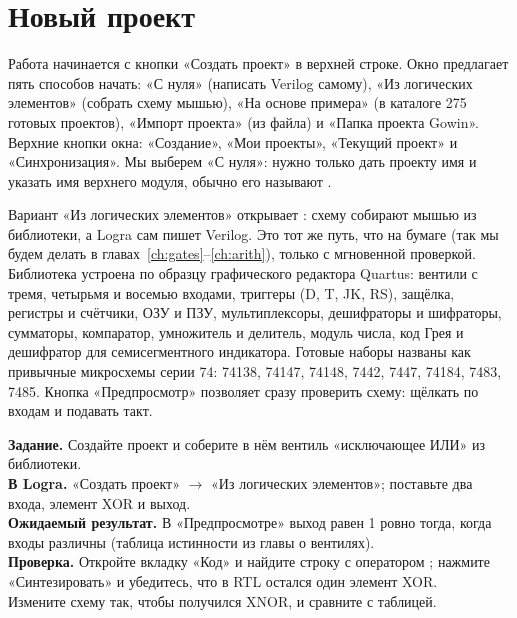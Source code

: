 \section{Новый проект}

Работа начинается с кнопки «Создать проект» в верхней строке. Окно
предлагает пять способов начать: «С нуля» (написать Verilog самому),
«Из логических элементов» (собрать схему мышью), «На основе примера» (в
каталоге 275 готовых проектов), «Импорт проекта» (из файла) и «Папка проекта
Gowin». Верхние кнопки окна: «Создание», «Мои проекты», «Текущий проект»
и «Синхронизация». Мы выберем «С нуля»: нужно только дать проекту имя и
указать имя верхнего модуля, обычно его называют .


Вариант «Из логических элементов» открывает : схему собирают
мышью из библиотеки, а Logra сам пишет Verilog. Это тот же путь, что на
бумаге (так мы будем делать в главах~\ref{ch:gates}--\ref{ch:arith}), только с
мгновенной проверкой. Библиотека устроена по
образцу графического редактора Quartus: вентили с тремя, четырьмя и восемью
входами, триггеры (D, T, JK, RS), защёлка, регистры и счётчики, ОЗУ и ПЗУ,
мультиплексоры, дешифраторы и шифраторы, сумматоры, компаратор, умножитель и
делитель, модуль числа, код Грея и дешифратор для семисегментного индикатора.
Готовые наборы названы как привычные микросхемы серии 74: 74138, 74147,
74148, 7442, 7447, 74184, 7483, 7485. Кнопка «Предпросмотр» позволяет сразу
проверить схему: щёлкать по входам и подавать такт.

\begin{diybox}
\textbf{Задание.} Создайте проект и соберите в нём вентиль «исключающее ИЛИ» из
библиотеки.\\
\textbf{В Logra.} «Создать проект» $\to$ «Из логических элементов»; поставьте
два входа, элемент XOR и выход.\\
\textbf{Ожидаемый результат.} В «Предпросмотре» выход равен 1 ровно тогда, когда
входы различны (таблица истинности из главы о вентилях).\\
\textbf{Проверка.} Откройте вкладку «Код» и найдите строку  с
оператором \code{\^{}}; нажмите «Синтезировать» и убедитесь, что в RTL остался
один элемент XOR.\\
 Измените схему так, чтобы получился XNOR, и сравните с таблицей.
\end{diybox}

